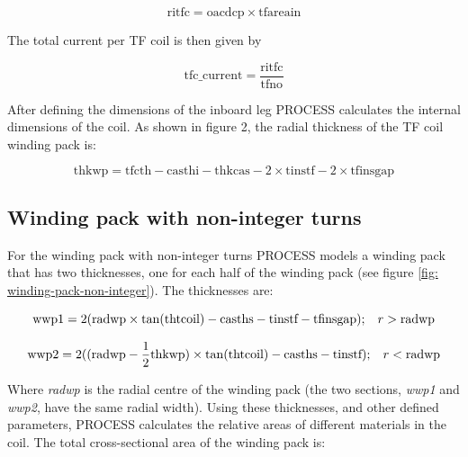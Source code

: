 \documentclass[hidelinks]{article}
\numberwithin{equation}{section}
\begin{document}
    \begin{equation}\label{eq: ritfc}
        \text{ritfc} = \text{oacdcp} \times \text{tfareain}
    \end{equation}

    \noi The total current per TF coil is then given by

    \begin{equation}
        \text{tfc\_current} = \frac{\text{ritfc}}{\text{tfno}}
    \end{equation}

    \noi After defining the dimensions of the inboard leg PROCESS calculates 
    the internal dimensions of the coil. As shown in figure 2, the radial thickness 
    of the TF coil winding pack is:

    \begin{equation}\label{eq: thkwp}
    \text{thkwp} = \text{tfcth} - \text{casthi} - \text{thkcas} - 2\times \text{tinstf} 
    - 2\times \text{tfinsgap}
    \end{equation}

    \subsection{Winding pack with non-integer turns}

    \noi For the winding pack with non-integer turns PROCESS models a winding pack 
    that has two thicknesses, one for each half of the winding pack (see figure 
    \ref{fig: winding-pack-non-integer}). The thicknesses are:

    \begin{equation}\label{eq: wwp1}
    \text{wwp1} = 2(\text{radwp}\times \tan(\text{thtcoil}) - \text{casths} - \text{tinstf} 
    - \text{tfinsgap}); \hspace{0.3cm} r > \text{radwp}
    \end{equation}

    \begin{equation}\label{eq: wwp2}
    \text{wwp2} = 2((\text{radwp}-\frac{1}{2}\text{thkwp})\times \tan(\text{thtcoil}) - 
    \text{casths} - \text{tinstf}); \hspace{0.3cm} r < \text{radwp} 
    \end{equation}

    \noi Where \emph{radwp} is the radial centre of the winding pack (the two sections, 
    \emph{wwp1} and \emph{wwp2}, have the same radial width). Using these thicknesses, and 
    other defined parameters, PROCESS calculates the relative areas of different materials in 
    the coil. The total cross-sectional area of the winding pack is:
\end{document}
